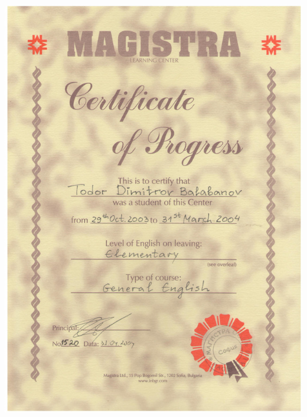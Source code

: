 \documentclass[english,a4paper]{europasscv}
\begin{document}
\includegraphics[width=\textwidth,height=\textheight,keepaspectratio]{Magistra2004}
\end{document}
